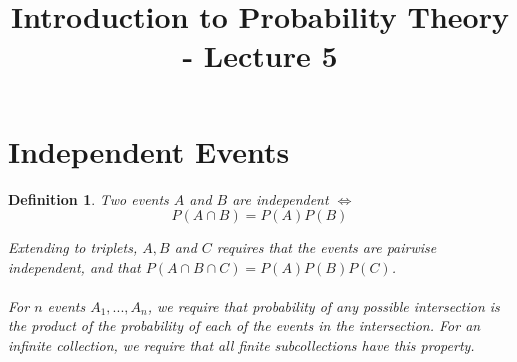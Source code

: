 \documentclass[12pt]{article} %
\title{Introduction to Probability Theory - Lecture 5}
\newtheorem{defn}{Definition}
\begin{document}
\maketitle
\section{Independent Events}
\begin{defn}
Two events $A$ and $B$ are \emph{independent} $\iff$ 
$$P(A\cap B) = P(A)P(B)$$

Extending to triplets, $A,B$ and $C$ requires that the events are pairwise independent, and that $P(A\cap B \cap C) = P(A)P(B)P(C)$.\\\\

For $n$ events $A_1,...,A_n$, we require that probability of any possible intersection is the product of the probability of each of the events in the intersection. For an infinite collection, we require that all finite subcollections have this property.
\end{defn}
\end{document}
